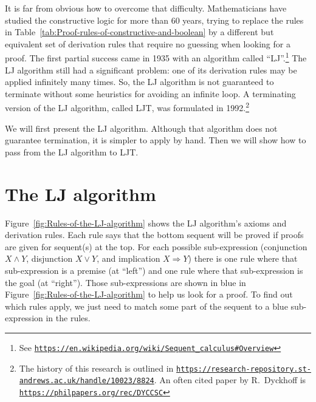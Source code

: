 It is far from obvious how to overcome that difficulty. Mathematicians
have studied the constructive logic for more than 60 years, trying
to replace the rules in Table~\ref{tab:Proof-rules-of-constructive-and-boolean}
by a different but equivalent set of derivation rules that require
no guessing when looking for a proof. The first partial success came
in 1935 with an algorithm called \textsf{``}LJ\textsf{''}.\footnote{See \texttt{\href{https://en.wikipedia.org/wiki/Sequent_calculus\#Overview}{https://en.wikipedia.org/wiki/Sequent\_calculus\#Overview}}}
The LJ algorithm still had a significant problem: one of its derivation
rules may be applied infinitely many times. So, the LJ algorithm is
not guaranteed to terminate without some heuristics for avoiding an
infinite loop. A terminating version of the LJ algorithm, called LJT,
was formulated in 1992.\footnote{The history of this research is outlined in \texttt{\href{https://research-repository.st-andrews.ac.uk/handle/10023/8824}{https://research-repository.st-andrews.ac.uk/handle/10023/8824}}.
An often cited paper by R.~Dyckhoff is \texttt{\href{https://philpapers.org/rec/DYCCSC}{https://philpapers.org/rec/DYCCSC}}} 

We will first present the LJ algorithm. Although that algorithm does
not guarantee termination, it is simpler to apply by hand. Then we
will show how to pass from the LJ algorithm to LJT.

\section{The LJ algorithm}

Figure~\ref{fig:Rules-of-the-LJ-algorithm} shows the LJ algorithm\textsf{'}s
axioms and derivation rules. Each rule says that the bottom sequent
will be proved if proofs are given for sequent(s) at the top. For
each possible sub-expression (conjunction $X\wedge Y$, disjunction
$X\vee Y$, and implication $X\Rightarrow Y$) there is one rule where
that sub-expression is a premise (at \textsf{``}left\textsf{''}) and one rule where
that sub-expression is the goal (at \textsf{``}right\textsf{''}). Those sub-expressions
are shown in blue in Figure~\ref{fig:Rules-of-the-LJ-algorithm}
to help us look for a proof. To find out which rules apply, we just
need to match some part of the sequent to a blue sub-expression in
the rules.

